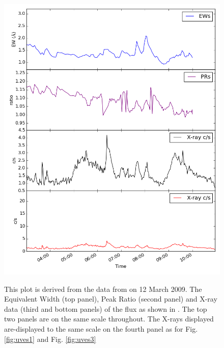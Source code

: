\begin{figure}[!htbp]
\centering
\includegraphics[scale=0.30]{Figures/uves2.png} \\
\caption{This plot is derived from the data from {\uves} on 12 March 2009.
  The Equivalent Width (top panel), Peak Ratio (second panel) and X-ray data (third and bottom panels) of the
  {\ha} flux as shown in \citet[Fig. 1]{fuhrmeister11}. The top two panels are on the same scale
  throughout. The X-rays displayed are-displayed to the same scale on the fourth panel as for Fig. \ref{fig:uves1} and
  Fig. \ref{fig:uves3}}
 \protect\label{fig:uves2}
\end{figure}
